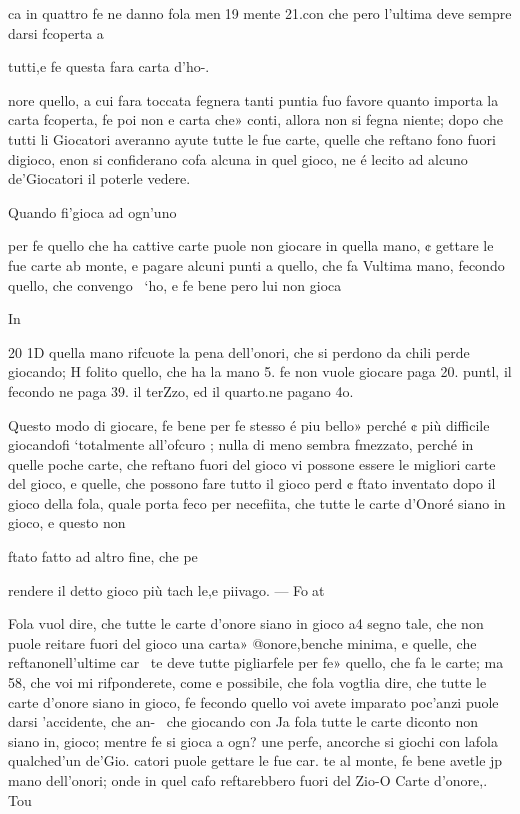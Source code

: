 \documentclass[12pt,a6paper]{article}
\begin{document}
ca in quattro fe ne danno fola men19
mente 21.con che pero l’ultima
deve sempre darsi fcoperta a

tutti,e fe questa fara carta d’ho-.

nore quello, a cui fara toccata
fegnera tanti puntia fuo favore
quanto importa la carta fcoperta, fe poi non e carta che»
conti, allora non si fegna niente; dopo che tutti li Giocatori
averanno ayute tutte le fue carte, quelle che reftano fono fuori digioco, enon si confiderano cofa alcuna in quel gioco, ne
é lecito ad alcuno de’Giocatori
il poterle vedere.

Quando fi'gioca ad ogn’uno

per fe quello che ha cattive carte puole non giocare in quella
mano, ¢ gettare le fue carte ab
monte, e pagare alcuni punti
a quello, che fa Vultima mano,
fecondo quello, che convengo~
‘ho, e fe bene pero lui non gioca

In
 

 

20
1D quella mano rifcuote la pena
dell’onori, che si perdono da
chili perde giocando; H folito
quello, che ha la mano 5. fe non
vuole giocare paga 20. puntl, il
fecondo ne paga 39. il terZzo, ed
il quarto.ne pagano 4o.

Questo modo di giocare, fe
bene per fe stesso é piu bello»
perché ¢ più difficile giocandofi
‘totalmente all’ofcuro ; nulla di
meno sembra fmezzato, perché
in quelle poche carte, che reftano fuori del gioco vi possone
essere le migliori carte del gioco, e quelle, che possono fare
tutto il gioco perd ¢ ftato inventato dopo il gioco della fola, quale porta feco per necefiita, che tutte le carte d’Onoré
siano in gioco, e questo non

ftato fatto ad altro fine, che pe

rendere il detto gioco più tach
le,e piivago. — Foat

Fola vuol dire, che tutte le
carte d’onore siano in gioco a4
segno tale, che non puole reitare fuori del gioco una carta»
@onore,benche minima, e quelle, che reftanonell’ultime car~
te deve tutte pigliarfele per fe»
quello, che fa le carte; ma 58,
che voi mi rifponderete, come
e possibile, che fola vogtlia dire, che tutte le carte d’onore
siano in gioco, fe fecondo quello voi avete imparato poc’anzi
puole darsi ’accidente, che an-~
che giocando con Ja fola tutte
le carte diconto non siano in,
gioco; mentre fe si gioca a ogn?
une perfe, ancorche si giochi
con lafola qualched’un de’Gio.
catori puole gettare le fue car.
te al monte, fe bene avetle jp
mano dell’onori; onde in quel
cafo reftarebbero fuori del Zio-O Carte d’onore,. Tou
\end{document}
